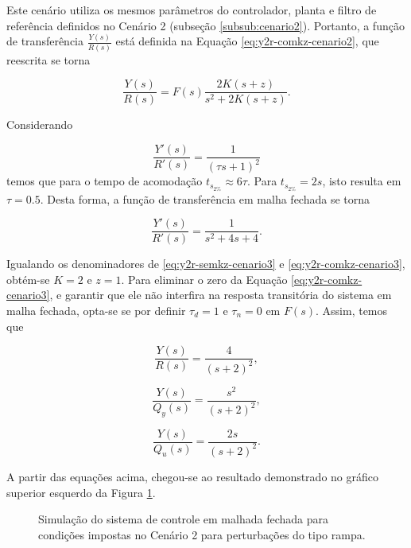 Este cenário utiliza os mesmos parâmetros do controlador, planta e filtro de
referência definidos no Cenário 2 (subseção \ref{subsub:cenario2}). Portanto, a
função de transferência $\frac{Y(s)}{R(s)}$ está definida na Equação
\ref{eq:y2r-comkz-cenario2}, que reescrita se torna 

\begin{equation}
    \label{eq:y2r-comkz-cenario3}
    \frac{Y(s)}{R(s)} = F(s)\frac{2K(s + z)}{s^2 + 2K(s + z)}.
\end{equation}

Considerando

\begin{equation}
    \label{eq:y2r-com-polos-iguais-cenario3}
    \frac{Y'(s)}{R'(s)} = \frac{1}{(\tau s + 1)^2}
\end{equation}
temos que para o tempo de acomodação $t_{s_{2\%}} \approx 6\tau$. Para
$t_{s_{2\%}} = 2s$, isto resulta em $\tau = 0.5$. Desta forma, a função de
transferência em malha fechada se torna

\begin{equation}
    \label{eq:y2r-semkz-cenario3}
    \frac{Y'(s)}{R'(s)} = \frac{1}{s^2 + 4s + 4}.
\end{equation}

Igualando os denominadores de \ref{eq:y2r-semkz-cenario3} e
\ref{eq:y2r-comkz-cenario3}, obtém-se $K = 2$ e $z = 1$. Para eliminar o zero da
Equação \ref{eq:y2r-comkz-cenario3}, e garantir que ele não interfira na
resposta transitória do sistema em malha fechada, opta-se se por definir
$\tau_{d} = 1$ e $\tau_{n} = 0$ em $F(s)$. Assim, temos que

\begin{equation}
    \label{eq:y2r-solucionado-cenario3}
    \frac{Y(s)}{R(s)} = \frac{4}{(s + 2)^2},
\end{equation}

\begin{equation}
    \label{eq:y2qy-solucionado-cenario3}
    \frac{Y(s)}{Q_{y}(s)} = \frac{s^2}{(s + 2)^2},
\end{equation}

\begin{equation}
    \label{eq:y2qu-solucionado-cenario3}
    \frac{Y(s)}{Q_{u}(s)} = \frac{2s}{(s + 2)^2}.
\end{equation}

A partir das equações acima, chegou-se ao resultado demonstrado no gráfico
superior esquerdo da Figura \ref{fig:resultado-cenario3}.

\begin{figure}[!ht]
    \caption{Simulação do sistema de controle em malhada fechada para condições
    impostas no Cenário 2 para perturbações do tipo rampa.}
    \vspace{-10pt}
    \hspace{-30pt}
    \label{fig:resultado-cenario3}
    \begin{minipage}{\linewidth}
        
    \end{minipage}
\end{figure}

